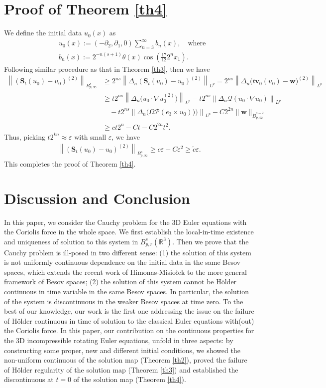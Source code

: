 \documentclass[12pt]{article}
\newcommand{\bbal}{\begin{align*}}
\newcommand{\pa}{\partial}
\newcommand{\na}{\nabla}
\newcommand{\De}{\Delta}
\newcommand{\cd}{\cdot}
\newcommand{\ep}{\varepsilon}
\newcommand{\R}{\mathbb{R}}
\newcommand{\f}{\left}
\newcommand{\g}{\right}
\begin{document}
\section{Proof of Theorem \ref{th4}}\label{sec5}

We define the initial data $u_0(x)$ as
\bbal
&u_0(x):=\f(-\pa_2,\pa_1,0\g)\sum\limits^{\infty}_{n=3}b_n(x), \quad\text{where}\\
&b_n(x):= 2^{-n(s+1)}\theta(x)\cos \f(\frac{17}{12}2^{n}x_1\g).
\end{align*}
Following similar procedure as that in Theorem \ref{th3}, then we have
\bbal
\f\|\f(\mathbf{S}_{t}(u_0)-u_0\g)^{(2)}\g\|_{B^{s}_{p,\infty}}
&\geq2^{{ns}}
\f\|\De_{n}\f(\mathbf{S}_{t}(u_0)-u_0\g)^{(2)}\g\|_{L^p}
=2^{{ns}}\f\|\De_{n}\big(t\mathbf{v}_0(u_0)-\mathbf{w}\big)^{(2)}\g\|_{L^p}
\nonumber\\
&\geq t2^{{n}s}\f\|\De_{n}\big(u_0\cd\na u_0^{(2)}\big)\g\|_{L^p}-
t2^{{n}s}\f\|\De_{n}\mathcal{Q}(u_0\cd\na u_0)\g\|_{L^p}\nonumber\\
&\quad- t2^{{n}s}\f\|\De_{n}\big(\Omega\mathcal{P}(e_3\times u_0))\big)\g\|_{L^p}-C2^{2{n}}\|\mathbf{w}\|_{\dot{B}^{s-2}_{p,\infty}}
\nonumber\\
&\geq ct2^{n}-Ct-C2^{2n}t^2.
\end{align*}
Thus, picking $t2^{kn}\approx\ep$ with small $\ep$, we have
\bbal
\f\|\f(\mathbf{S}_{t}(u_0)-u_0\g)^{(2)}\g\|_{B^{s}_{p,\infty}}\geq c\ep-C\ep^2\geq \tilde{c}\ep.
\end{align*}
This completes the proof of Theorem \ref{th4}.


\section{Discussion and Conclusion }
In this paper, we consider the Cauchy problem for the 3D Euler equations with the Coriolis force in the whole space. We first establish the local-in-time existence and uniqueness of solution to this system in $B^s_{p,r}(\R^3)$. Then we prove that the Cauchy problem is ill-posed in two different sense:
(1) the solution of this system is not uniformly continuous dependence on the initial data in the same Besov spaces, which extends the recent work of Himonas-Misio{\l}ek \cite[Comm. Math. Phys., 296, 2010]{HM1} to the more general framework of Besov spaces;
(2) the solution of this system cannot be H\"{o}lder continuous in time variable in the same Besov spaces. In particular, the solution of the system is discontinuous in the weaker Besov spaces at time zero. To the best of our knowledge, our work is the first one addressing the issue on the failure of H\"{o}lder continuous in time of solution to the classical Euler equations with(out) the Coriolis force. In this paper, our contribution on the continuous properties for the 3D incompressible rotating Euler equations, unfold in three aspects: by constructing some proper, new and different initial conditions, we showed the non-uniform continuous of the solution map (Theorem \ref{th2}), proved the failure of H\"{o}lder regularity of the solution map (Theorem \ref{th3}) and  established the discontinuous at $t = 0$ of the solution map (Theorem \ref{th4}).
\end{document}
